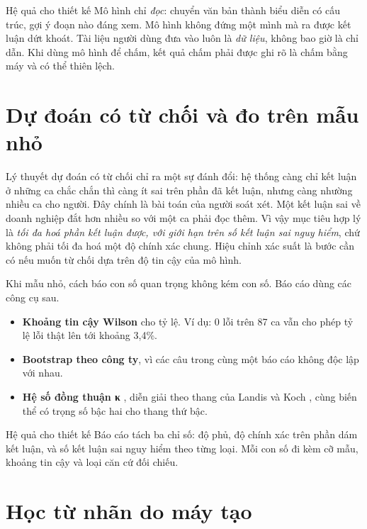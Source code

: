 \begin{hopy}{Hệ quả cho thiết kế}
Mô hình chỉ \emph{đọc}: chuyển văn bản thành biểu diễn có cấu trúc, gợi ý đoạn nào đáng xem. Mô hình không đứng một mình mà ra được kết luận dứt khoát. Tài liệu người dùng đưa vào luôn là \emph{dữ liệu}, không bao giờ là chỉ dẫn. Khi dùng mô hình để chấm, kết quả chấm phải được ghi rõ là chấm bằng máy và có thể thiên lệch.
\end{hopy}

\section{Dự đoán có từ chối và đo trên mẫu nhỏ}

Lý thuyết dự đoán có từ chối \cite{chow1970,geifman2017} chỉ ra một sự đánh đổi: hệ thống càng chỉ kết luận ở những ca chắc chắn thì càng ít sai trên phần đã kết luận, nhưng càng nhường nhiều ca cho người. Đây chính là bài toán của người soát xét. Một kết luận sai về doanh nghiệp đắt hơn nhiều so với một ca phải đọc thêm. Vì vậy mục tiêu hợp lý là \emph{tối đa hoá phần kết luận được, với giới hạn trên số kết luận sai nguy hiểm}, chứ không phải tối đa hoá một độ chính xác chung. Hiệu chỉnh xác suất \cite{guo2017calibration} là bước cần có nếu muốn từ chối dựa trên độ tin cậy của mô hình.

Khi mẫu nhỏ, cách báo con số quan trọng không kém con số. Báo cáo dùng các công cụ sau.
\begin{itemize}
\item \textbf{Khoảng tin cậy Wilson} \cite{wilson1927} cho tỷ lệ. Ví dụ: 0 lỗi trên 87 ca vẫn cho phép tỷ lệ lỗi thật lên tới khoảng 3,4\%.
\item \textbf{Bootstrap theo công ty}, vì các câu trong cùng một báo cáo không độc lập với nhau.
\item \textbf{Hệ số đồng thuận κ} \cite{cohen1960}, diễn giải theo thang của Landis và Koch \cite{landis1977}, cùng biến thể có trọng số bậc hai cho thang thứ bậc.
\end{itemize}

\begin{hopy}{Hệ quả cho thiết kế}
Báo cáo tách ba chỉ số: độ phủ, độ chính xác trên phần dám kết luận, và số kết luận sai nguy hiểm theo từng loại. Mỗi con số đi kèm cỡ mẫu, khoảng tin cậy và loại căn cứ đối chiếu.
\end{hopy}

\section{Học từ nhãn do máy tạo}


